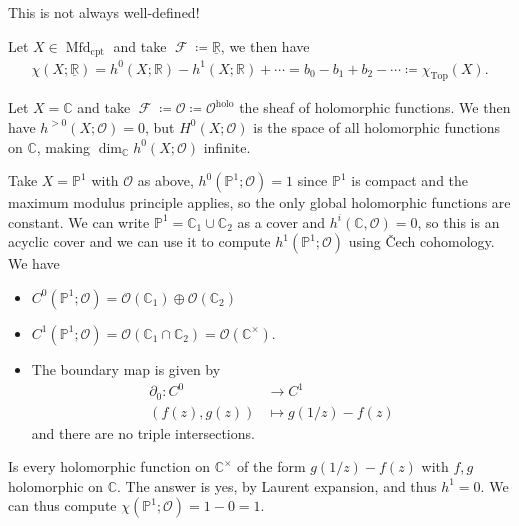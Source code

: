 \begin{warnings}

This is not always well-defined!

\end{warnings}

\begin{example}[?]

Let \(X\in {\operatorname{Mfd}}_{\text{cpt}}\) and take
\(\operatorname{\mathcal{F}} \coloneqq\underline{{\mathbb{R}}}\), we
then have
\begin{align*}
\chi(X; \underline{{\mathbb{R}}}) = h^0(X; {\mathbb{R}}) - h^1(X; {\mathbb{R}}) + \cdots = b_0 - b_1 + b_2 - \cdots \coloneqq\chi_{{\operatorname{Top}}}(X)
.\end{align*}

\end{example}

\begin{example}[?]

Let \(X = {\mathbb{C}}\) and take
\(\operatorname{\mathcal{F}} \coloneqq{\mathcal{O}}\coloneqq{\mathcal{O}}^{\text{holo}}\)
the sheaf of holomorphic functions. We then have
\(h^{> 0}(X; {\mathcal{O}}) = 0\), but \(H^0(X; {\mathcal{O}})\) is the
space of all holomorphic functions on \({\mathbb{C}}\), making
\(\dim_{\mathbb{C}}h^0(X; {\mathcal{O}})\) infinite.

\end{example}

\begin{example}[?]

Take \(X = {\mathbb{P}}^1\) with \({\mathcal{O}}\) as above,
\(h^0({\mathbb{P}}^1; {\mathcal{O}}) = 1\) since \({\mathbb{P}}^1\) is
compact and the maximum modulus principle applies, so the only global
holomorphic functions are constant. We can write
\({\mathbb{P}}^1 = {\mathbb{C}}_1 \cup{\mathbb{C}}_2\) as a cover and
\(h^i({\mathbb{C}}, {\mathcal{O}}) = 0\), so this is an acyclic cover
and we can use it to compute \(h^1({\mathbb{P}}^1; {\mathcal{O}})\)
using Čech cohomology. We have

\begin{itemize}
\item
  \(C^0({\mathbb{P}}^1; {\mathcal{O}}) = {\mathcal{O}}({\mathbb{C}}_1) \oplus {\mathcal{O}}({\mathbb{C}}_2)\)
\item
  \(C^1({\mathbb{P}}^1; {\mathcal{O}}) = {\mathcal{O}}({\mathbb{C}}_1 \cap{\mathbb{C}}_2) = {\mathcal{O}}({\mathbb{C}}^{\times})\).
\item
  The boundary map is given by
  \begin{align*}
  {\partial}_0: C^0 &\to C^1 \\
  ( f(z), g(z) ) &\mapsto g(1/z) - f(z)
  \end{align*}
  and there are no triple intersections.
\end{itemize}

Is every holomorphic function on \({\mathbb{C}}^{\times}\) of the form
\(g(1/z) - f(z)\) with \(f,g\) holomorphic on \({\mathbb{C}}\). The
answer is yes, by Laurent expansion, and thus \(h^1 = 0\). We can thus
compute \(\chi({\mathbb{P}}^1; {\mathcal{O}}) = 1-0 = 1\).

\end{example}

